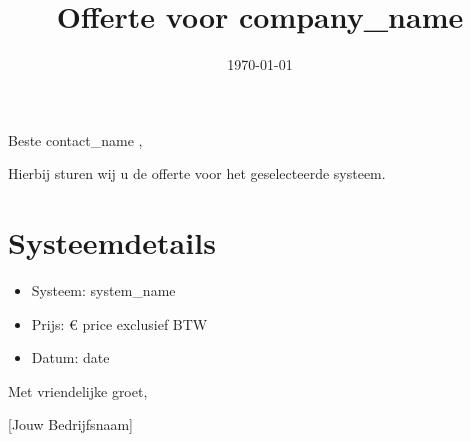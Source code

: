 \documentclass[a4paper,12pt]{article}
\title{Offerte voor {{ company_name }}}
\date{\today}
\begin{document}
\maketitle
Beste {{ contact_name }},

Hierbij sturen wij u de offerte voor het geselecteerde systeem.

\section*{Systeemdetails}
\begin{itemize}
    \item Systeem: {{ system_name }}
    \item Prijs: €{{ price }} exclusief BTW
    \item Datum: {{ date }}
\end{itemize}

Met vriendelijke groet,

[Jouw Bedrijfsnaam]
\end{document}
